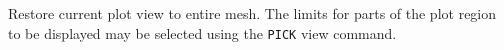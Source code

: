 \headb

Restore current plot view to entire mesh.  The limits for parts of the
plot region to be displayed may be selected using the {\tt PICK} view command.
\vfill
\eject
